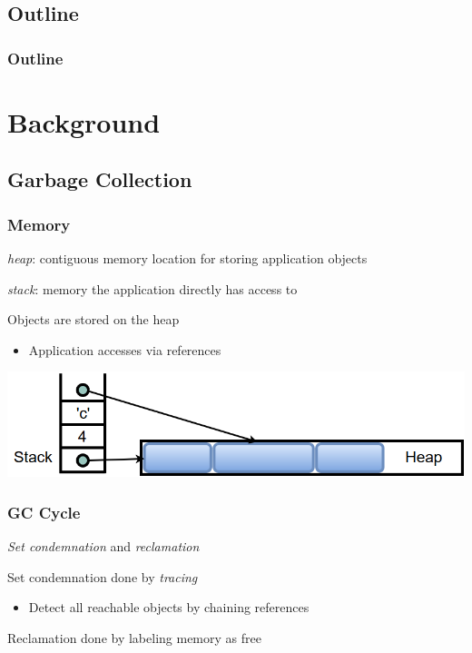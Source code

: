 \documentclass{beamer}
\newcommand{\linespace}{\vskip 0.25cm}
\begin{document}
\subsection*{Outline}

\begin{frame}
  \frametitle{Outline}
  \tableofcontents  
\end{frame}



\section[Background]{Background}

\subsection[GC Basics]{Garbage Collection}

\begin{frame}

\frametitle{Memory}

\emph{heap}: contiguous memory location for storing application objects

\linespace
\linespace

\emph{stack}: memory the application directly has access to

\linespace
\linespace

Objects are stored on the heap
\begin{itemize}
\item Application accesses via references
\end{itemize}

\linespace
\linespace

\begin{center}
\includegraphics[width=.8\textwidth]{Illustrations/stack_and_heap.png}
\end{center}

\end{frame}

\begin{frame}

\frametitle{GC Cycle}

\emph{Set condemnation} and \emph{reclamation}

\linespace
\linespace

Set condemnation done by \emph{tracing}
\begin{itemize}
\item Detect all reachable objects by chaining references
\end{itemize}

\linespace
\linespace

Reclamation done by labeling memory as free

\end{frame}
\end{document}
